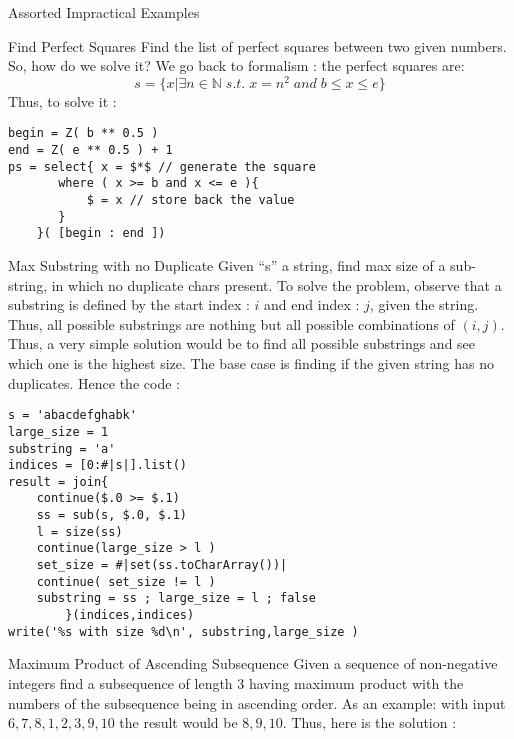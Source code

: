 \begin{section}{Assorted Impractical Examples}
\begin{subsection}{Find Perfect Squares}
Find the list of perfect squares between two given numbers.
So, how do we solve it? We go back to formalism : the perfect squares are:
$$
s = \{ x | \exists n \in \mathbb{N} \; s.t.\; x = n^2  \; and \;  b \le x \le e  \} 
$$
Thus, to solve it :
\begin{center}\begin{minipage}{\linewidth}
\begin{lstlisting}[style=JexlStyle]
begin = Z( b ** 0.5 )
end = Z( e ** 0.5 ) + 1 
ps = select{ x = $*$ // generate the square 
       where ( x >= b and x <= e ){
           $ = x // store back the value    
       } 
    }( [begin : end ])
\end{lstlisting}  
\end{minipage}\end{center}
\end{subsection}

\begin{subsection}{Max Substring with no Duplicate}
Given ``s'' a string, find max size of a sub-string, 
in which no duplicate chars present. To solve the problem,
observe that a substring is defined by the start index : $i$ 
and end index : $j$, given the string. 
Thus, all possible substrings are nothing but all possible combinations of $(i,j)$.
Thus, a very simple solution would be to find all possible substrings and 
see which one is the highest size. 
The base case is finding if the given 
string has no duplicates. Hence the code :

\begin{center}\begin{minipage}{\linewidth}
\begin{lstlisting}[style=JexlStyle]
s = 'abacdefghabk'
large_size = 1
substring = 'a'
indices = [0:#|s|].list()
result = join{
    continue($.0 >= $.1)
    ss = sub(s, $.0, $.1)
    l = size(ss)
    continue(large_size > l )
    set_size = #|set(ss.toCharArray())| 
    continue( set_size != l )
    substring = ss ; large_size = l ; false 
        }(indices,indices) 
write('%s with size %d\n', substring,large_size )
\end{lstlisting}  
\end{minipage}\end{center}
\end{subsection}

\begin{subsection}{Maximum Product of Ascending Subsequence}
Given a sequence of non-negative integers find a subsequence of length 3 
having maximum product with the numbers of the subsequence being in ascending order. 
As an example: with input  $6,7, 8, 1, 2, 3, 9, 10$  the result would be $8, 9, 10$.
Thus, here is the solution :


\end{subsection}
\end{section}
